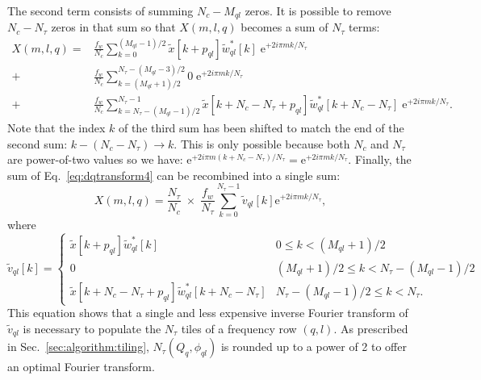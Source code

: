 The second term consists of summing $N_c-M_{ql}$ zeros. It is possible to remove $N_c-N_\tau$ zeros in that sum so that $X(m,l,q)$ becomes a sum of $N_\tau$ terms:
\begin{align}
  X(m, l, q)
  = & \frac{f_w}{N_c} \sum_{k=0}^{(M_{ql}-1)/2}{\tilde{x}[k+p_{ql}]\tilde{w}_{ql}^*[k] \; \mathrm{e}^{+2i\pi mk/N_\tau}} \\
  + & \frac{f_w}{N_c} \sum_{k=(M_{ql}+1)/2}^{N_\tau-(M_{ql}-3)/2}{0 \; \mathrm{e}^{+2i\pi mk/N_\tau}} \\
  + & \frac{f_w}{N_c} \sum_{k=N_\tau-(M_{ql}-1)/2}^{N_\tau-1}{\tilde{x}[k+N_c-N_\tau+p_{ql}]\tilde{w}_{ql}^*[k+N_c-N_\tau] \; \mathrm{e}^{+2i\pi mk/N_\tau}} .
  \label{eq:dqtransform4}
\end{align}
Note that the index $k$ of the third sum has been shifted to match the end of the second sum: $k-(N_c-N_\tau) \rightarrow k$. This is only possible because both $N_c$ and $N_\tau$ are power-of-two values so we have: $\mathrm{e}^{+2i\pi m(k+N_c-N_\tau)/N_\tau} = \mathrm{e}^{+2i\pi mk/N_\tau}$. Finally, the sum of Eq.~\ref{eq:dqtransform4} can be recombined into a single sum:
\begin{equation}
  X(m, l, q) = \frac{N_\tau}{N_c} \; \times \; \frac{f_w}{N_\tau} \sum_{k=0}^{N_\tau-1}{\tilde{v}_{ql}[k]\mathrm{e}^{+2i\pi mk/N_\tau}},
  \label{eq:dqtransform5}
\end{equation}
where
\begin{equation}
  \tilde{v}_{ql}[k] =
  \begin{cases}
    \tilde{x}[k+p_{ql}]\tilde{w}_{ql}^*[k]                     & 0 \le k < (M_{ql}+1)/2 \\
    0                                                        & (M_{ql}+1)/2 \le k < N_\tau-(M_{ql}-1)/2 \\
    \tilde{x}[k+N_c-N_\tau+p_{ql}]\tilde{w}_{ql}^*[k+N_c-N_\tau] & N_\tau-(M_{ql}-1)/2 \le k < N_\tau.
  \end{cases}
  \label{eq:v1}
\end{equation}
This equation shows that a single and less expensive inverse Fourier transform of $\tilde{v}_{ql}$ is necessary to populate the $N_\tau$ tiles of a frequency row $(q,l)$. As prescribed in Sec.~\ref{sec:algorithm:tiling}, $N_\tau(Q_q, \phi_{ql})$ is rounded up to a power of 2 to offer an optimal Fourier transform.

